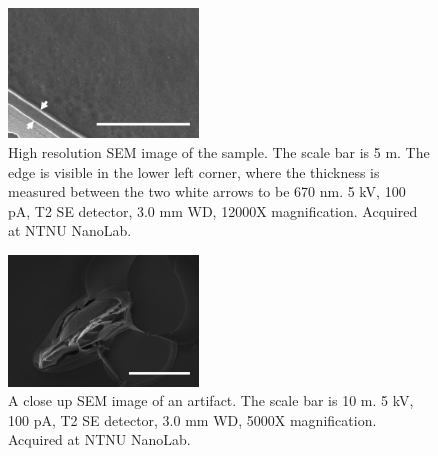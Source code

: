 \begin{figure}[ht]
    \centering
    \includegraphics[width=0.45\textwidth]{figures/sem_high_res_5um.jpg}
    \caption{High resolution SEM image of the sample.
        The scale bar is 5 \textmu m.
        The edge is visible in the lower left corner, where the thickness is measured between the two white arrows to be 670 nm.
        5 kV, 100 pA, T2 SE detector, 3.0 mm WD, 12000X magnification.
        Acquired at NTNU NanoLab.
    }
    \label{fig:sem_high_res}
\end{figure}

\begin{figure}[ht]
    \centering
    \includegraphics[width=0.45\textwidth]{figures/sem_artifact_10um.jpg}
    \caption{A close up SEM image of an artifact.
        The scale bar is 10 \textmu m.
        5 kV, 100 pA, T2 SE detector, 3.0 mm WD, 5000X magnification.
        Acquired at NTNU NanoLab.
    }
    \label{fig:sem_artifact}
\end{figure}
